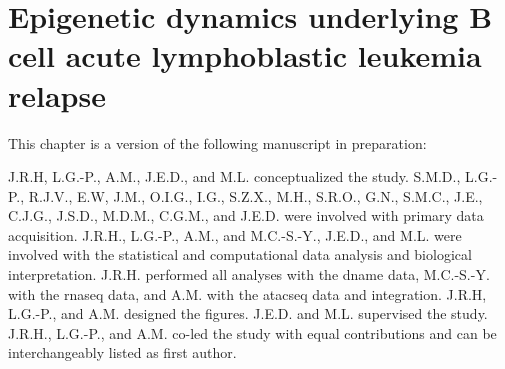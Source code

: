 \chapter{Epigenetic dynamics underlying B cell acute lymphoblastic leukemia relapse}
\label{chap:BALL}

This chapter is a version of the following manuscript in preparation:


J.R.H, L.G.-P., A.M., J.E.D., and M.L. conceptualized the study.
S.M.D., L.G.-P., R.J.V., E.W, J.M., O.I.G., I.G., S.Z.X., M.H., S.R.O., G.N., S.M.C., J.E., C.J.G., J.S.D., M.D.M., C.G.M., and J.E.D. were involved with primary data acquisition.
J.R.H., L.G.-P., A.M., and M.C.-S.-Y., J.E.D., and M.L. were involved with the statistical and computational data analysis and biological interpretation.
J.R.H. performed all analyses with the \gls{dname} data, M.C.-S.-Y. with the \gls{rnaseq} data, and A.M. with the \gls{atacseq} data and integration.
J.R.H, L.G.-P., and A.M. designed the figures.
J.E.D. and M.L. supervised the study.
J.R.H., L.G.-P., and A.M. co-led the study with equal contributions and can be interchangeably listed as first author.






